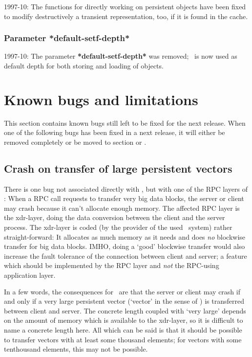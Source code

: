 1997-10: The functions for directly working on persistent objects have
been fixed to modify destructively a transient representation, too, if
it is found in the cache.

\subsubsection{Parameter *default-setf-depth*}

1997-10: The parameter \textbf{*default-setf-depth*} was removed;
\ is now used as default depth for both storing
and loading of objects.

\section{Known bugs and limitations}

This section contains known bugs still left to be fixed for the next
release. When one of the following bugs has been fixed in a next
release, it will either be removed completely or be moved to section
 or .

\subsection{Crash on transfer of large persistent vectors}

There is one bug not associated directly with \plobwoexcl, but with
one of the RPC layers of \unix: When a RPC call requests to transfer
very big data blocks, the server or client may crash because it can't
allocate enough memory. The affected RPC layer is the xdr-layer, doing
the data conversion between the client and the server process. The
xdr-layer is coded (by the provider of the used \unix\ system) rather
straight-forward: It allocates as much memory as it needs and does
\emph{no} blockwise transfer for big data blocks. IMHO, doing a `good'
blockwise transfer would also increase the fault tolerance of the
connection between client and server; a feature which should be
implemented by the RPC layer and \emph{not} the RPC-using application
layer.

In a few words, the consequences for \plob\ are that the server or
client may crash if and only if a very large persistent vector
(`vector' in the sense of \cl) is transferred between client and
server. The concrete length coupled with `very large' depends on the
amount of memory which is available to the xdr-layer, so it is
difficult to name a concrete length here. All which can be said is
that it should be possible to transfer vectors with at least some
thousand elements; for vectors with some tenthousand elements, this
may not be possible.

